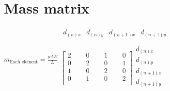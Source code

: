 \documentclass{article}
\begin{document}
\section{Mass matrix}
    \begin{math}
    m_{\text{Each element}}=\frac{\rho AE}{L}
        \begin{matrix}
            \begin{matrix}
            d_{(n)x} & d_{(n)y} & d_{(n+1)x} & d_{(n+1)y}\\
            \end{matrix}\\
            \begin{bmatrix}
            2&\;\;\;\;\;0&\;\;\;\;\;1&\;\;\;\;\;0\\
            0&\;\;\;\;\;2&\;\;\;\;\;0&\;\;\;\;\;1\\
            1&\;\;\;\;\;0&\;\;\;\;\;2&\;\;\;\;\;0\\
            0&\;\;\;\;\;1&\;\;\;\;\;0&\;\;\;\;\;2\\
            \end{bmatrix}
            \begin{matrix}
            d_{(n)x}\\
            d_{(n)y}\\
            d_{(n+1)x}\\
            d_{(n+1)y}\\
            \end{matrix}
        \end{matrix}
    \end{math}
\end{document}
